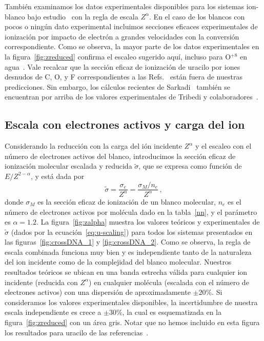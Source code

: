 También examinamos los datos experimentales disponibles para los sistemas
ion-blanco bajo estudio~\cite{itoh2013,iriki2011,wolff2014,wang2016,
Bhattacharjee2019,agnihotri2012,agnihotri2013,Luna2007,Bolorizadeh86,
H_Rudd85,toburen80,Ohsawa05,Bhattacharjee17,DalCappello2009,Tribedi_O_water} 
con la regla de escala $Z^\alpha$. 
En el caso de los blancos con pocos o ningún dato experimental incluimos 
secciones eficaces experimentales de ionización por impacto de electrón 
\cite{rahman2016,bug2017,wolf2019,fuss2009} a grandes velocidades con la
conversión correspondiente. Como se observa, la mayor parte de los datos
experimentales en la figura~\ref{fig:zreduced} confirma el escaleo 
sugerido aquí, incluso para O$^{+8}$ en agua~\cite{Tribedi_O_water}. 
Vale recalcar que la sección eficaz de ionización de uracilo por 
iones desnudos de C, O, y F correspondientes a las 
Refs.~\cite{agnihotri2012,agnihotri2013} están fuera de nuestras 
predicciones. Sin embargo, los cálculos recientes de 
Sarkadi~\cite{sarkadi2016} también se encuentran por arriba de los 
valores experimentales de Tribedi y 
colaboradores~\cite{agnihotri2012,agnihotri2013}.

\subsection{Escala con electrones activos y carga del ion}
\label{sec:nez_scaling}

Considerando la reducción con la carga del ión incidente $Z^\alpha$ y el 
escaleo con el número de electrones activos del blanco, introducimos 
la sección eficaz de ionización molecular escalada y reducida 
$\tilde{\sigma}$, que se expresa como función de $E/Z^{2-\alpha}$, y
está dada por
\begin{equation}
 \tilde{\sigma}=\frac{\sigma_e}{Z^{\alpha}}=\frac{\sigma_M/n_e}{Z^{\alpha}}\,,
\label{eq:u-scaling}
\end{equation}
donde $\sigma_M$ es la sección eficaz de ionización de un blanco 
molecular, $n_e$ es el número de electrones activos por molécula dado
en la tabla~\ref{nn}, y el parámetro es $\alpha=1.2$. La 
figura~\ref{fig:zalpha} muestra los valores teóricos y experimentales
de $\tilde{\sigma}$ (dados por la ecuación~\ref{eq:u-scaling}) para todos 
los sistemas presentados en las figuras~\ref{fig:crossDNA_1} y 
\ref{fig:crossDNA_2}. Como se observa, la regla de escala combinada 
funciona muy bien y es independiente tanto de la naturaleza del ion 
incidente como de la complejidad del blanco molecular. Nuestros 
resultados teóricos se ubican en una banda estrecha válida para cualquier
ion incidente (reducida con $Z^\alpha$) en cualquier molécula
(escalada con el número de electrones activos) con una dispersión de 
aproximadamente $\pm 20\%$. Si consideramos los valores experimentales
disponibles, la incertidumbre de nuestra escala independiente es 
crece a $\pm 30\%$, la cual es esquematizada en la 
figura~\ref{fig:zreduced} con un área gris. Notar que no hemos incluido 
en esta figura los resultados para uracilo de las 
referencias~\cite{agnihotri2012,agnihotri2013}. 

